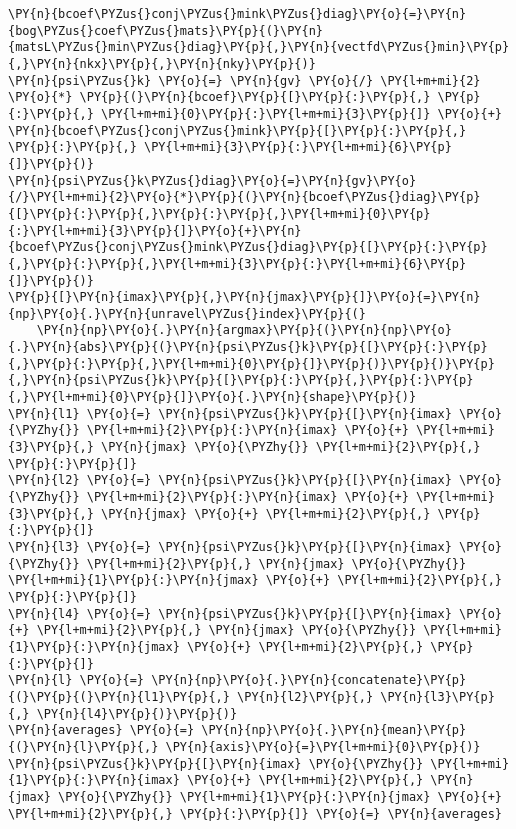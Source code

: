 \begin{Verbatim}[commandchars=\\\{\}]
\PY{n}{bcoef\PYZus{}conj\PYZus{}mink\PYZus{}diag}\PY{o}{=}\PY{n}{bog\PYZus{}coef\PYZus{}mats}\PY{p}{(}\PY{n}{matsL\PYZus{}min\PYZus{}diag}\PY{p}{,}\PY{n}{vectfd\PYZus{}min}\PY{p}{,}\PY{n}{nkx}\PY{p}{,}\PY{n}{nky}\PY{p}{)}
\PY{n}{psi\PYZus{}k} \PY{o}{=} \PY{n}{gv} \PY{o}{/} \PY{l+m+mi}{2} \PY{o}{*} \PY{p}{(}\PY{n}{bcoef}\PY{p}{[}\PY{p}{:}\PY{p}{,} \PY{p}{:}\PY{p}{,} \PY{l+m+mi}{0}\PY{p}{:}\PY{l+m+mi}{3}\PY{p}{]} \PY{o}{+} \PY{n}{bcoef\PYZus{}conj\PYZus{}mink}\PY{p}{[}\PY{p}{:}\PY{p}{,} \PY{p}{:}\PY{p}{,} \PY{l+m+mi}{3}\PY{p}{:}\PY{l+m+mi}{6}\PY{p}{]}\PY{p}{)}
\PY{n}{psi\PYZus{}k\PYZus{}diag}\PY{o}{=}\PY{n}{gv}\PY{o}{/}\PY{l+m+mi}{2}\PY{o}{*}\PY{p}{(}\PY{n}{bcoef\PYZus{}diag}\PY{p}{[}\PY{p}{:}\PY{p}{,}\PY{p}{:}\PY{p}{,}\PY{l+m+mi}{0}\PY{p}{:}\PY{l+m+mi}{3}\PY{p}{]}\PY{o}{+}\PY{n}{bcoef\PYZus{}conj\PYZus{}mink\PYZus{}diag}\PY{p}{[}\PY{p}{:}\PY{p}{,}\PY{p}{:}\PY{p}{,}\PY{l+m+mi}{3}\PY{p}{:}\PY{l+m+mi}{6}\PY{p}{]}\PY{p}{)}
\PY{p}{[}\PY{n}{imax}\PY{p}{,}\PY{n}{jmax}\PY{p}{]}\PY{o}{=}\PY{n}{np}\PY{o}{.}\PY{n}{unravel\PYZus{}index}\PY{p}{(}
    \PY{n}{np}\PY{o}{.}\PY{n}{argmax}\PY{p}{(}\PY{n}{np}\PY{o}{.}\PY{n}{abs}\PY{p}{(}\PY{n}{psi\PYZus{}k}\PY{p}{[}\PY{p}{:}\PY{p}{,}\PY{p}{:}\PY{p}{,}\PY{l+m+mi}{0}\PY{p}{]}\PY{p}{)}\PY{p}{)}\PY{p}{,}\PY{n}{psi\PYZus{}k}\PY{p}{[}\PY{p}{:}\PY{p}{,}\PY{p}{:}\PY{p}{,}\PY{l+m+mi}{0}\PY{p}{]}\PY{o}{.}\PY{n}{shape}\PY{p}{)}
\PY{n}{l1} \PY{o}{=} \PY{n}{psi\PYZus{}k}\PY{p}{[}\PY{n}{imax} \PY{o}{\PYZhy{}} \PY{l+m+mi}{2}\PY{p}{:}\PY{n}{imax} \PY{o}{+} \PY{l+m+mi}{3}\PY{p}{,} \PY{n}{jmax} \PY{o}{\PYZhy{}} \PY{l+m+mi}{2}\PY{p}{,} \PY{p}{:}\PY{p}{]}
\PY{n}{l2} \PY{o}{=} \PY{n}{psi\PYZus{}k}\PY{p}{[}\PY{n}{imax} \PY{o}{\PYZhy{}} \PY{l+m+mi}{2}\PY{p}{:}\PY{n}{imax} \PY{o}{+} \PY{l+m+mi}{3}\PY{p}{,} \PY{n}{jmax} \PY{o}{+} \PY{l+m+mi}{2}\PY{p}{,} \PY{p}{:}\PY{p}{]}
\PY{n}{l3} \PY{o}{=} \PY{n}{psi\PYZus{}k}\PY{p}{[}\PY{n}{imax} \PY{o}{\PYZhy{}} \PY{l+m+mi}{2}\PY{p}{,} \PY{n}{jmax} \PY{o}{\PYZhy{}} \PY{l+m+mi}{1}\PY{p}{:}\PY{n}{jmax} \PY{o}{+} \PY{l+m+mi}{2}\PY{p}{,} \PY{p}{:}\PY{p}{]}
\PY{n}{l4} \PY{o}{=} \PY{n}{psi\PYZus{}k}\PY{p}{[}\PY{n}{imax} \PY{o}{+} \PY{l+m+mi}{2}\PY{p}{,} \PY{n}{jmax} \PY{o}{\PYZhy{}} \PY{l+m+mi}{1}\PY{p}{:}\PY{n}{jmax} \PY{o}{+} \PY{l+m+mi}{2}\PY{p}{,} \PY{p}{:}\PY{p}{]}
\PY{n}{l} \PY{o}{=} \PY{n}{np}\PY{o}{.}\PY{n}{concatenate}\PY{p}{(}\PY{p}{(}\PY{n}{l1}\PY{p}{,} \PY{n}{l2}\PY{p}{,} \PY{n}{l3}\PY{p}{,} \PY{n}{l4}\PY{p}{)}\PY{p}{)}
\PY{n}{averages} \PY{o}{=} \PY{n}{np}\PY{o}{.}\PY{n}{mean}\PY{p}{(}\PY{n}{l}\PY{p}{,} \PY{n}{axis}\PY{o}{=}\PY{l+m+mi}{0}\PY{p}{)}
\PY{n}{psi\PYZus{}k}\PY{p}{[}\PY{n}{imax} \PY{o}{\PYZhy{}} \PY{l+m+mi}{1}\PY{p}{:}\PY{n}{imax} \PY{o}{+} \PY{l+m+mi}{2}\PY{p}{,} \PY{n}{jmax} \PY{o}{\PYZhy{}} \PY{l+m+mi}{1}\PY{p}{:}\PY{n}{jmax} \PY{o}{+} \PY{l+m+mi}{2}\PY{p}{,} \PY{p}{:}\PY{p}{]} \PY{o}{=} \PY{n}{averages}

\end{Verbatim}
